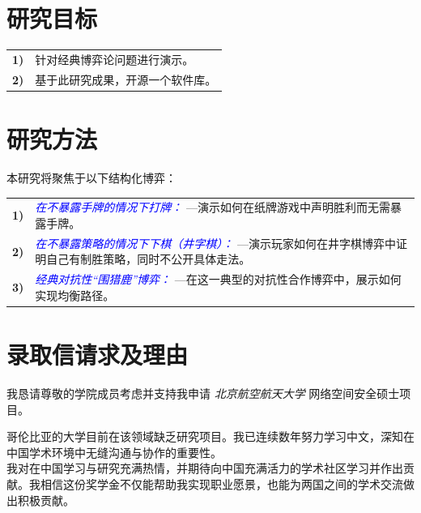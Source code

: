 \documentclass[conference]{IEEEtran}
\begin{document}
\vspace{5pt}
\section{研究目标}

\begin{tabular}{lp{210pt}}
    {\small \textbf{1)}} & {\small 针对经典博弈论问题进行演示。} \\
    {\small \textbf{2)}} & {\small 基于此研究成果，开源一个软件库。} 
\end{tabular}

\vspace{15pt}

\section{研究方法}
\vspace{5pt}
本研究将聚焦于以下结构化博弈：
\vspace{5pt}

\begin{tabular}{lp{210pt}}
    {\small \textbf{1)}} & {\textcolor{blue}{\textit{在不暴露手牌的情况下打牌：}} \linebreak---演示如何在纸牌游戏中声明胜利而无需暴露手牌。} \\[6pt]
    {\small \textbf{2)}} & {\textcolor{blue}{\textit{在不暴露策略的情况下下棋（井字棋）：}} \linebreak---演示玩家如何在井字棋博弈中证明自己有制胜策略，同时不公开具体走法。} \\[6pt]
    {\small \textbf{3)}} & {\textcolor{blue}{\textit{经典对抗性“围猎鹿”博弈：}} \linebreak---在这一典型的对抗性合作博弈中，展示如何实现均衡路径。} 
\end{tabular}

\section{录取信请求及理由}
我恳请尊敬的学院成员考虑并支持我申请 \textit{北京航空航天大学} 网络空间安全硕士项目。

哥伦比亚的大学目前在该领域缺乏研究项目。我已连续数年努力学习中文，深知在中国学术环境中无缝沟通与协作的重要性。\\
我对在中国学习与研究充满热情，并期待向中国充满活力的学术社区学习并作出贡献。我相信这份奖学金不仅能帮助我实现职业愿景，也能为两国之间的学术交流做出积极贡献。

%
\end{document}
